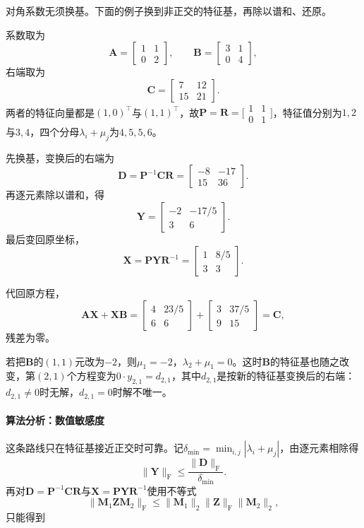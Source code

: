 对角系数无须换基。下面的例子换到非正交的特征基，再除以谱和、还原。

\begin{example}[特征基下的逐元素求解]
\label{ex:ls-sylvester-eigenbasis}
系数取为
\[
 \bm A=\begin{bmatrix}1&1\\0&2\end{bmatrix},\qquad
 \bm B=\begin{bmatrix}3&1\\0&4\end{bmatrix},
\]
右端取为
\[
 \bm C=\begin{bmatrix}7&12\\15&21\end{bmatrix}.
\]
两者的特征向量都是$(1,0)^\top$与$(1,1)^\top$，故$\bm P=\bm R=\bigl[\begin{smallmatrix}1&1\\0&1\end{smallmatrix}\bigr]$，特征值分别为$1,2$与$3,4$，四个分母$\lambda_i+\mu_j$为$4,5,5,6$。

先换基，变换后的右端为
\[
 \bm D=\bm P^{-1}\bm C\bm R=\begin{bmatrix}-8&-17\\15&36\end{bmatrix}.
\]
再逐元素除以谱和，得
\[
 \bm Y=\begin{bmatrix}-2&-17/5\\3&6\end{bmatrix}.
\]
最后变回原坐标，
\[
 \bm X=\bm P\bm Y\bm R^{-1}=\begin{bmatrix}1&8/5\\3&3\end{bmatrix}.
\]

代回原方程，
\[
 \bm A\bm X+\bm X\bm B
 =\begin{bmatrix}4&23/5\\6&6\end{bmatrix}+\begin{bmatrix}3&37/5\\9&15\end{bmatrix}
 =\bm C ,
\]
残差为零。

若把$\bm B$的$(1,1)$元改为$-2$，则$\mu_1=-2$，$\lambda_2+\mu_1=0$。这时$\bm B$的特征基也随之改变，第$(2,1)$个方程变为$0\cdot y_{2,1}=d_{2,1}$，其中$d_{2,1}$是按新的特征基变换后的右端：$d_{2,1}\neq0$时无解，$d_{2,1}=0$时解不唯一。
\end{example}

\paragraph{算法分析：数值敏感度}
这条路线只在特征基接近正交时可靠。记$\delta_{\min}=\min_{i,j}|\lambda_i+\mu_j|$，由逐元素相除得
\[
 \lVert\bm Y\rVert_{\mathrm F}\leq\frac{\lVert\bm D\rVert_{\mathrm F}}{\delta_{\min}} .
\]
再对$\bm D=\bm P^{-1}\bm C\bm R$与$\bm X=\bm P\bm Y\bm R^{-1}$使用不等式
\[
 \lVert\bm M_1\bm Z\bm M_2\rVert_{\mathrm F}\leq\lVert\bm M_1\rVert_2\lVert\bm Z\rVert_{\mathrm F}\lVert\bm M_2\rVert_2 ,
\]
只能得到

